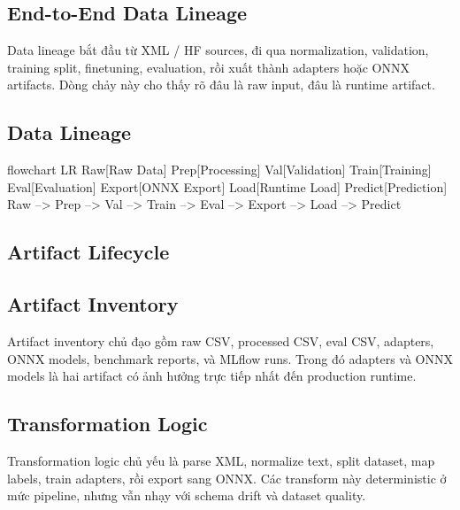 \subsection{End-to-End Data Lineage}
Data lineage bắt đầu từ XML / HF sources, đi qua normalization, validation, training split, finetuning, evaluation, rồi xuất thành adapters hoặc ONNX artifacts. Dòng chảy này cho thấy rõ đâu là raw input, đâu là runtime artifact.

\subsection{Data Lineage}
\begin{mermaidblock}
flowchart LR
  Raw[Raw Data]
  Prep[Processing]
  Val[Validation]
  Train[Training]
  Eval[Evaluation]
  Export[ONNX Export]
  Load[Runtime Load]
  Predict[Prediction]
  Raw --> Prep --> Val --> Train --> Eval --> Export --> Load --> Predict
\end{mermaidblock}

\subsection{Artifact Lifecycle}
\subsection{Artifact Inventory}
Artifact inventory chủ đạo gồm raw CSV, processed CSV, eval CSV, adapters, ONNX models, benchmark reports, và MLflow runs. Trong đó adapters và ONNX models là hai artifact có ảnh hưởng trực tiếp nhất đến production runtime.

\subsection{Transformation Logic}
Transformation logic chủ yếu là parse XML, normalize text, split dataset, map labels, train adapters, rồi export sang ONNX. Các transform này deterministic ở mức pipeline, nhưng vẫn nhạy với schema drift và dataset quality.

